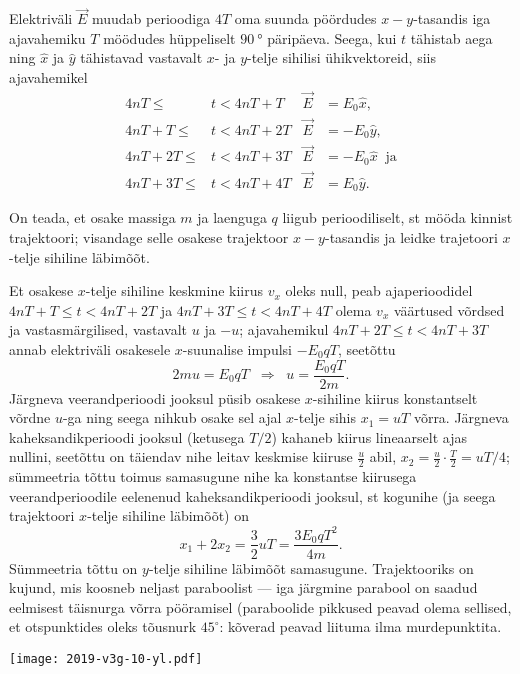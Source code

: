 \setAuthor{}

Elektriväli $\vec E$ muudab perioodiga $4T$ oma suunda pöördudes $x-y$-tasandis iga 
ajavahemiku $T$ möödudes hüppeliselt $\SI{90}\degree$ päripäeva. Seega, kui $t$ tähistab aega 
ning $\hat x$ ja $\hat y$ tähistavad vastavalt $x$- ja $y$-telje sihilisi ühikvektoreid,  siis ajavahemikel
\begin{align*}
4nT\le &t < 4nT+T \;\; & \vec E&=E_0\hat x,\\
4nT+T\le &t < 4nT+2T   & \vec E&=-E_0\hat y,\\
4nT+2T\le &t < 4nT+3T  & \vec E&=-E_0\hat x \;\;\mbox{ja}\\
4nT+3T\le &t < 4nT+4T & \vec E&=E_0\hat y.
\end{align*}

On teada, et osake massiga $m$ ja laenguga $q$ liigub perioodiliselt, st mööda kinnist trajektoori; visandage selle osakese 
trajektoor $x-y$-tasandis ja leidke trajetoori $x$-telje sihiline läbimõõt. 

\hint

\solu
Et osakese $x$-telje sihiline keskmine kiirus $v_x$ oleks null, peab ajaperioodidel $4nT+T\le t < 4nT+2T$ ja  $4nT+3T\le t < 4nT+4T$ olema $v_x$ väärtused võrdsed ja vastasmärgilised, vastavalt $u$ ja $-u$; ajavahemikul $4nT+2T\le t < 4nT+3T$ annab elektriväli osakesele $x$-suunalise impulsi $-E_0qT$, seetõttu
$$2mu=E_0qT \;\;\Rightarrow\;\; u=\frac{E_0qT}{2m}.$$
Järgneva veerandperioodi jooksul püsib osakese $x$-sihiline kiirus konstantselt võrdne $u$-ga ning seega nihkub osake sel ajal $x$-telje sihis $x_1=uT$ võrra. Järgneva kaheksandikperioodi jooksul (ketusega $T/2$) kahaneb kiirus lineaarselt ajas nullini, seetõttu on täiendav nihe leitav keskmise kiiruse $\frac u2$ abil, $x_2=\frac u2\cdot \frac T2=uT/4$; sümmeetria tõttu toimus samasugune nihe ka konstantse kiirusega veerandperioodile eelenenud kaheksandikperioodi jooksul, st kogunihe (ja seega trajektoori $x$-telje sihiline läbimõõt) on $$x_1+2x_2=\frac32 uT=\frac{3E_0qT^2}{4m}.$$
Sümmeetria tõttu on $y$-telje sihiline läbimõõt samasugune. Trajektooriks on kujund, mis koosneb neljast paraboolist --- iga järgmine parabool on saadud eelmisest täisnurga võrra pööramisel (paraboolide pikkused peavad olema sellised, et otspunktides oleks tõusnurk $45^\circ$: kõverad peavad liituma ilma murdepunktita.

\vspace{-20pt}
\begin{center}
  \texttt{[image: 2019-v3g-10-yl.pdf]}
\end{center}
\vspace{-20pt}
\probend